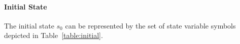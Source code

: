 \begin{comment}
As stated in section \ref{subsubsect:Rigid_Relation}, the kitting domain has two rigid relations: \stvar{efftype} and \stvar{effhtype}. In the proposed example, the \class{EndEffector} \const{eff_1} can hold \class{KitTrays} and \class{KitInstances}, while the \class{EndEffector} \const{eff_1} can hold \class{Parts}. \stvar{efftype} can be stated as follows: \stvar{efftype}(\const{eff_1})=\{\const{kt_1},\const{kins_1}\} and \stvar{efftype}(\const{eff_1})=\{\const{part_{A-1}},\const{part_{A-2}},\const{part_{B}},\const{part_{C}}\}. In the same way, the \class{EndEffectorHolder} \const{effh_1} can hold the \class{EndEffector} \const{eff_1}, while the \class{EndEffectorHolder} \const{effh_2} can hold the \class{EndEffector} \const{eff_2}. \stvar{effhtype} can be stated as follows: \stvar{effhtype}(\const{effh_1})=\{\const{eff_1}\} and \stvar{effhtype}(\const{effh_2})=\{\const{eff_2}\}.
\end{comment}

\paragraph{Initial State}
The initial state $s_0$ can be represented by the set of state variable symbols depicted in Table~\ref{table:initial}.


